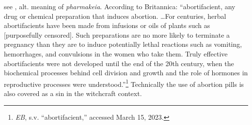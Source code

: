 \item[Abortifacient,]

see , alt. meaning of \emph{pharmakeia}.
According to Britannica: ``abortifacient, any drug or chemical preparation that induces abortion. \ldots For centuries, herbal abortifacients have been made from infusions or oils of plants such as [purposefully censored]. Such preparations are no more likely to terminate a pregnancy than they are to induce potentially lethal reactions such as vomiting, hemorrhages, and convulsions in the women who take them. Truly effective abortifacients were not developed until the end of the 20th century, when the biochemical processes behind cell division and growth and the role of hormones in reproductive processes were understood.''\footnote{\emph{EB}, s.v. ``abortifacient,'' accessed March 15, 2023.}
Technically the use of abortion pills is also covered as a sin in the witchcraft context.
